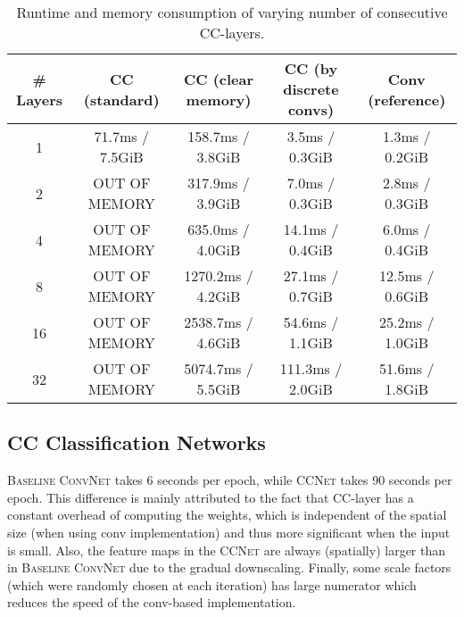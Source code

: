 \begin{appendices}
\begin{table}[h!]
    \centering
    \begin{tabular}{c|cccc}
    \toprule
\# Layers & CC (standard)   & CC (clear memory) & CC (by discrete convs) & Conv (reference) \\
\midrule
1        & 71.7ms / 7.5GiB & 158.7ms / 3.8GiB  & 3.5ms / 0.3GiB         & 1.3ms / 0.2GiB   \\
2        & OUT OF MEMORY   & 317.9ms / 3.9GiB  & 7.0ms / 0.3GiB         & 2.8ms / 0.3GiB   \\
4        & OUT OF MEMORY   & 635.0ms / 4.0GiB  & 14.1ms / 0.4GiB        & 6.0ms / 0.4GiB   \\
8        & OUT OF MEMORY   & 1270.2ms / 4.2GiB & 27.1ms / 0.7GiB        & 12.5ms / 0.6GiB  \\
16       & OUT OF MEMORY   & 2538.7ms / 4.6GiB & 54.6ms / 1.1GiB        & 25.2ms / 1.0GiB  \\
32       & OUT OF MEMORY   & 5074.7ms / 5.5GiB & 111.3ms / 2.0GiB       & 51.6ms / 1.8GiB  \\
    \bottomrule
    \end{tabular}
    \vspace{5pt}
    \caption{Runtime and memory consumption of varying number of consecutive CC-layers.}
    \label{tab:runtime_by_num_layers}
\end{table}

\subsection{CC Classification Networks}
\textsc{Baseline ConvNet} takes 6 seconds per epoch, while \textsc{CCNet} takes 90 seconds per epoch. This difference is mainly attributed to the fact that CC-layer has a constant overhead of computing the weights, which is independent of the spatial size (when using conv implementation) and thus more significant when the input is small. Also, the feature maps in the \textsc{CCNet} are always (spatially) larger than in \textsc{Baseline ConvNet} due to the gradual downscaling. Finally, some scale factors (which were randomly chosen at each iteration) has large numerator which reduces the speed of the conv-based implementation.

\end{appendices}
